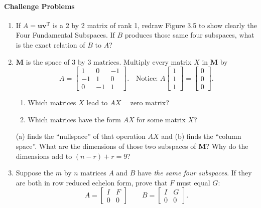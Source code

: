 \documentclass[14pt, a4paper]{article}
\begin{document}
\paragraph{Challenge Problems}
\begin{enumerate}[resume]
    \item If $A = \boldsymbol{u}\boldsymbol{v}^{\mathrm{T}}$ is a 2 by 2 matrix of rank 1, redraw Figure 3.5 to show clearly the Four Fundamental Subspaces. If $B$ produces those same four subspaces, what is the exact relation of $B$ to $A$?

    \item $\mathbf{M}$ is the space of 3 by 3 matrices. Multiply every matrix $X$ in $\mathbf{M}$ by
          \[
              A = \begin{bmatrix} 1 & 0 & -1 \\ -1 & 1 & 0 \\ 0 & -1 & 1 \end{bmatrix}. \quad
              \text{Notice: } A \begin{bmatrix} 1 \\ 1 \\ 1 \end{bmatrix} = \begin{bmatrix} 0 \\ 0 \\ 0 \end{bmatrix}.
          \]
          \begin{enumerate}
              \item Which matrices $X$ lead to $AX = \text{zero matrix}$?
              \item Which matrices have the form $AX$ for some matrix $X$?
          \end{enumerate}
          (a) finds the ``nullspace'' of that operation $AX$ and (b) finds the ``column space''. What are the dimensions of those two subspaces of $\mathbf{M}$? Why do the dimensions add to $(n - r) + r = 9$?

    \item Suppose the $m$ by $n$ matrices $A$ and $B$ have \emph{the same four subspaces}. If they are both in row reduced echelon form, prove that $F$ must equal $G$:
          \[
              A = \begin{bmatrix} I & F \\ 0 & 0 \end{bmatrix} \qquad
              B = \begin{bmatrix} I & G \\ 0 & 0 \end{bmatrix}.
          \]
\end{enumerate}
\newpage
\end{document}
